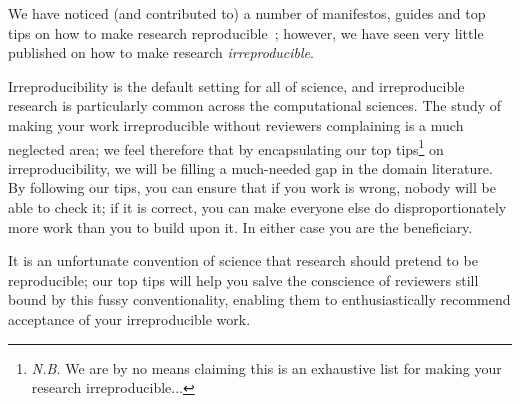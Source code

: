 \documentclass[a4paper,11pt]{article}
\begin{document}
We have noticed (and contributed to) a number of manifestos, guides
and top tips on how to make research
reproducible~\cite{prlic+procter:2012,sandve-et-al:2013,gent:2013,wilson-et-al:2014,goble:2014,crick-et-al_wssspe2,crick-et-al_recomp2014,stodden+miguez:2014};
however, we have seen very little published on how to make research
\emph{irreproducible}.

Irreproducibility is the default setting for all of science, and
irreproducible research is particularly common across the
computational sciences. The study of making your work irreproducible
without reviewers complaining is a much neglected area; we feel
therefore that by encapsulating our top tips\footnote{{\emph{N.B.}} We
are by no means claiming this is an exhaustive list for making your
research irreproducible...} on irreproducibility, we will be filling a
much-needed gap in the domain literature. By following our tips, you
can ensure that if you work is wrong, nobody will be able to check it;
if it is correct, you can make everyone else do disproportionately
more work than you to build upon it. In either case you are the
beneficiary.

It is an unfortunate convention of science that research should
pretend to be reproducible; our top tips will help you salve the
conscience of reviewers still bound by this fussy conventionality,
enabling them to enthusiastically recommend acceptance of your
irreproducible work.
\end{document}
